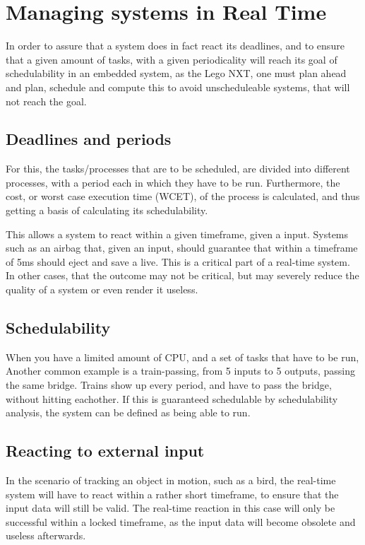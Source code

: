 \section{Managing systems in Real Time}
In order to assure that a system does in fact react its deadlines, and to ensure that a given amount of tasks, with a given periodicality will reach its goal of schedulability in an embedded system, as the Lego NXT, one must plan ahead and plan, schedule and compute this to avoid unscheduleable systems, that will not reach the goal.\citationneeded

\subsection{Deadlines and periods}
For this, the tasks/processes that are to be scheduled, are divided into different processes, with a period each in which they have to be run.
Furthermore, the cost, or worst case execution time (WCET), of the process is calculated, and thus getting a basis of calculating its schedulability.

This allows a system to react within a given timeframe, given a input.
Systems such as an airbag that, given an input, should guarantee that within a timeframe of 5ms should eject and save a live.
This is a critical part of a real-time system.
In other cases, that the outcome may not be critical, but may severely reduce the quality of a system or even render it useless.\citationneeded

\subsection{Schedulability}
When you have a limited amount of CPU, and a set of tasks that have to be run,
Another common example is a train-passing, from 5 inputs to 5 outputs, passing the same bridge.
Trains show up every period, and have to pass the bridge, without hitting eachother.
If this is guaranteed schedulable by schedulability analysis, the system can be defined as being able to run.\citationneeded

\subsection{Reacting to external input}
In the scenario of tracking an object in motion, such as a bird, the real-time system will have to react within a rather short timeframe, to ensure that the input data will still be valid.
The real-time reaction in this case will only be successful within a locked timeframe, as the input data will become obsolete and useless afterwards.
